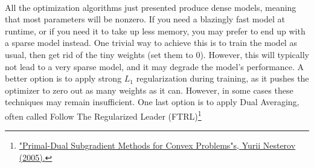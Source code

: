 \paragraph{} All the optimization algorithms just presented produce dense models, meaning that most parameters will be nonzero. If you need a blazingly fast model at runtime, or if you need it to take up less memory, you may prefer to end up with a sparse model instead. One trivial way to achieve this is to train the model as usual, then get rid of the tiny weights (set them to 0). However, this will typically not lead to a very sparse model, and it may degrade the model's performance. A better option is to apply strong $L_1$ regularization during training, as it pushes the optimizer to zero out as many weights as it can. However, in some cases these techniques may remain insufficient. One last option is to apply Dual Averaging, often called Follow The Regularized Leader (FTRL)\footnote{\href{However, in some cases these techniques may remain insufficient. One last option is to apply Dual Averaging, often called Follow The Regularized Leader (FTRL)}{"Primal-Dual Subgradient Methods for Convex Problems"s, Yurii Nesterov (2005).}}

